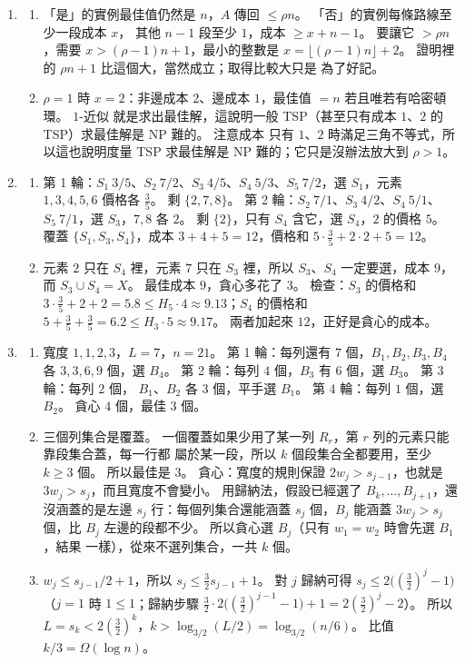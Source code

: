 \begin{enumerate}
\item
\begin{enumerate}
\item 「是」的實例最佳值仍然是 $n$，$A$ 傳回 $\le \rho n$。 「否」的實例每條路線至少一段成本 $x$，
其他 $n - 1$ 段至少 $1$，成本 $\ge x + n - 1$。 要讓它 $> \rho n$，需要 $x > (\rho - 1)n + 1$，最小的整數是
$x = \lfloor (\rho - 1)n \rfloor + 2$。 證明裡的 $\rho n + 1$ 比這個大，當然成立；取得比較大只是
為了好記。
\item $\rho = 1$ 時 $x = 2$：非邊成本 $2$、邊成本 $1$，最佳值 $= n$ 若且唯若有哈密頓環。 $1$-近似
就是求出最佳解，這說明一般 TSP（甚至只有成本 $1$、$2$ 的 TSP）求最佳解是 NP 難的。 注意成本
只有 $1$、$2$ 時滿足三角不等式，所以這也說明度量 TSP 求最佳解是 NP 難的；它只是沒辦法放大到
$\rho > 1$。
\end{enumerate}

\item
\begin{enumerate}
\item 第 1 輪：$S_1\ 3/5$、$S_2\ 7/2$、$S_3\ 4/5$、$S_4\ 5/3$、$S_5\ 7/2$，選 $S_1$，元素
$1, 3, 4, 5, 6$ 價格各 $\frac35$。 剩 $\{2, 7, 8\}$。 第 2 輪：$S_2\ 7/1$、$S_3\ 4/2$、$S_4\ 5/1$、
$S_5\ 7/1$，選 $S_3$，$7, 8$ 各 $2$。 剩 $\{2\}$，只有 $S_4$ 含它，選 $S_4$，$2$ 的價格 $5$。 覆蓋
$\{S_1, S_3, S_4\}$，成本 $3 + 4 + 5 = 12$，價格和 $5 \cdot \frac35 + 2 \cdot 2 + 5 = 12$。
\item 元素 $2$ 只在 $S_4$ 裡，元素 $7$ 只在 $S_3$ 裡，所以 $S_3$、$S_4$ 一定要選，成本 $9$，而
$S_3 \cup S_4 = X$。 最佳成本 $9$，貪心多花了 $3$。 檢查：$S_3$ 的價格和
$3 \cdot \frac35 + 2 + 2 = 5.8 \le H_5 \cdot 4 \approx 9.13$；$S_4$ 的價格和
$5 + \frac35 + \frac35 = 6.2 \le H_3 \cdot 5 \approx 9.17$。 兩者加起來 $12$，正好是貪心的成本。
\end{enumerate}

\item
\begin{enumerate}
\item 寬度 $1, 1, 2, 3$，$L = 7$，$n = 21$。 第 1 輪：每列還有 $7$ 個，$B_1, B_2, B_3, B_4$ 各
$3, 3, 6, 9$ 個，選 $B_4$。 第 2 輪：每列 $4$ 個，$B_3$ 有 $6$ 個，選 $B_3$。 第 3 輪：每列 $2$ 個，
$B_1$、$B_2$ 各 $3$ 個，平手選 $B_1$。 第 4 輪：每列 $1$ 個，選 $B_2$。 貪心 $4$ 個，最佳 $3$ 個。
\item 三個列集合是覆蓋。 一個覆蓋如果少用了某一列 $R_r$，第 $r$ 列的元素只能靠段集合蓋，每一行都
屬於某一段，所以 $k$ 個段集合全都要用，至少 $k \ge 3$ 個。 所以最佳是 $3$。 貪心：寬度的規則保證
$2w_j > s_{j-1}$，也就是 $3w_j > s_j$，而且寬度不會變小。 用歸納法，假設已經選了
$B_k, \ldots, B_{j+1}$，還沒涵蓋的是左邊 $s_j$ 行：每個列集合還能涵蓋 $s_j$ 個，$B_j$ 能涵蓋
$3w_j > s_j$ 個，比 $B_j$ 左邊的段都不少。 所以貪心選 $B_j$（只有 $w_1 = w_2$ 時會先選 $B_1$，結果
一樣），從來不選列集合，一共 $k$ 個。
\item $w_j \le s_{j-1}/2 + 1$，所以 $s_j \le \frac32 s_{j-1} + 1$。 對 $j$ 歸納可得
$s_j \le 2\bigl((\frac32)^j - 1\bigr)$（$j = 1$ 時 $1 \le 1$；歸納步驟
$\frac32 \cdot 2\bigl((\frac32)^{j-1} - 1\bigr) + 1 = 2(\frac32)^j - 2$）。 所以
$L = s_k < 2(\frac32)^k$，$k > \log_{3/2}(L/2) = \log_{3/2}(n/6)$。 比值 $k/3 = \Omega(\log n)$。
\end{enumerate}


\end{enumerate}
